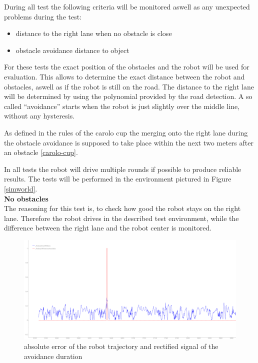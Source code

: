 During all test the following criteria will be monitored aswell as any unexpected problems during the test:

\begin{itemize}
	\item distance to the right lane when no obstacle is close
	\item obstacle avoidance distance to object
\end{itemize}

For these tests the exact position of the obstacles and the robot will be used for evaluation. This allows to determine the exact distance between the robot and obstacles, aswell as if the robot is still on the road. The distance to the right lane will be determined by using the polynomial provided by the road detection. A so called ``avoidance'' starts when the robot is just slightly over the middle line, without any hysteresis.

As defined in the rules of the carolo cup the merging onto the right lane during the obstacle avoidance is supposed to take place within the next two meters after an obstacle \ref{carolo-cup}.

In all tests the robot will drive multiple rounds if possible to produce reliable results. The tests will be performed in the environment pictured in Figure \ref{simworld}.\\

\textbf{No obstacles}\\
The reasoning for this test is, to check how good the robot stays on the right lane. Therefore the robot drives in the described test environment, while the difference between the right lane and the robot center is monitored.

\begin{figure}[H]
	\includegraphics[width=\textwidth]{Pictures/final analysis no obstacle}
	\caption{absolute error of the robot trajectory and rectified signal of the avoidance duration}
	\label{noobserr}
\end{figure}

